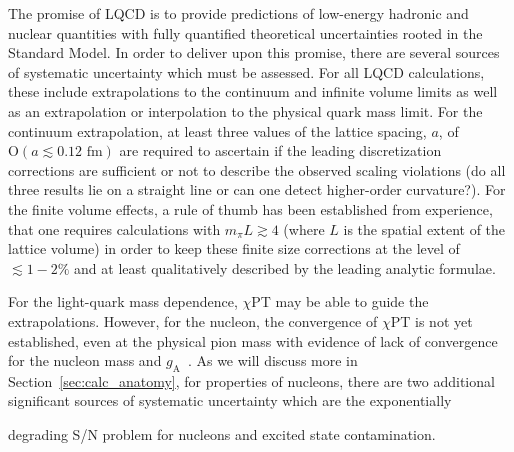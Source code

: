 \documentclass{ar-1col}
\newcommand{\change}[1]{{\color{red} #1}}
\begin{document}
The promise of LQCD is to provide predictions of low-energy hadronic and nuclear quantities with fully quantified theoretical uncertainties rooted in the Standard Model.
In order to deliver upon this promise, there are several sources of systematic uncertainty which must be \change{assessed}.
For all LQCD calculations, these include extrapolations to the continuum and infinite volume limits as well as an extrapolation or interpolation to the physical quark mass limit.
For the continuum extrapolation, at least three values of the lattice spacing, $a$, of $\mathrm{O}(a\lesssim0.12\textrm{ fm})$ are required to ascertain if the leading discretization corrections are sufficient or not to describe the observed scaling violations (do all three results lie on a straight line or can one detect higher-order curvature?).
For the finite volume effects, a rule of thumb has been established from experience, that one requires calculations with $m_\pi L \gtrsim4$ (where $L$ is the spatial extent of the lattice volume) in order to keep these finite size corrections at the level of $\lesssim1-2\%$ and at least qualitatively described by the leading analytic formulae.%
\begin{marginnote}
\end{marginnote}%
For the light-quark mass dependence, $\chi$PT may be able to guide the extrapolations.
However, for the nucleon, the convergence of $\chi$PT is not yet established, even at the physical pion mass with evidence of lack of convergence for the nucleon mass and $g_{\mathrm{A}}$~\cite{Chang:2018uxx,Walker-Loud:2019cif}.
As we will discuss more in Section~\ref{sec:calc_anatomy}, for properties of nucleons, there are two additional significant sources of systematic uncertainty which are the exponentially%
\begin{marginnote}
\end{marginnote}%
degrading S/N problem for nucleons and excited state contamination.



\end{document}
